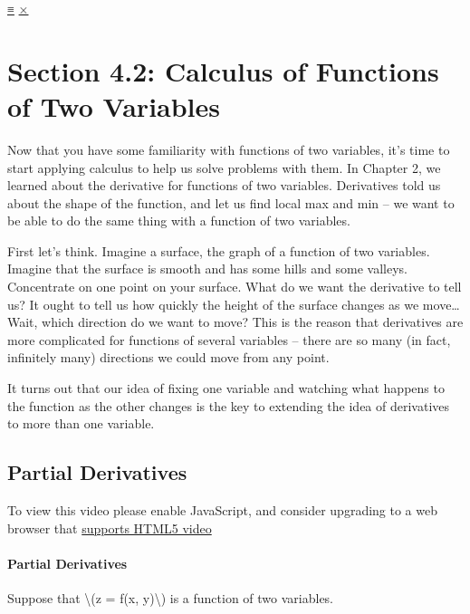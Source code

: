 \protect\hyperlink{main-nav}{≡} \protect\hyperlink{close-nav}{×}

\hypertarget{section-4.2-calculus-of-functions-of-two-variables}{%
\section{Section 4.2: Calculus of Functions of Two
Variables}\label{section-4.2-calculus-of-functions-of-two-variables}}

Now that you have some familiarity with functions of two variables, it's
time to start applying calculus to help us solve problems with them. In
Chapter 2, we learned about the derivative for functions of two
variables. Derivatives told us about the shape of the function, and let
us find local max and min -- we want to be able to do the same thing
with a function of two variables.

First let's think. Imagine a surface, the graph of a function of two
variables. Imagine that the surface is smooth and has some hills and
some valleys. Concentrate on one point on your surface. What do we want
the derivative to tell us? It ought to tell us how quickly the height of
the surface changes as we move\ldots{} Wait, which direction do we want
to move? This is the reason that derivatives are more complicated for
functions of several variables -- there are so many (in fact, infinitely
many) directions we could move from any point.

It turns out that our idea of fixing one variable and watching what
happens to the function as the other changes is the key to extending the
idea of derivatives to more than one variable.

\hypertarget{partial-derivatives}{%
\subsection{Partial Derivatives}\label{partial-derivatives}}

To view this video please enable JavaScript, and consider upgrading to a
web browser that \href{http://videojs.com/html5-video-support/}{supports
HTML5 video}

\hypertarget{partial-derivatives-1}{%
\paragraph{Partial Derivatives}\label{partial-derivatives-1}}

Suppose that \textbackslash{}(z = f(x, y)\textbackslash{}) is a function
of two variables.

